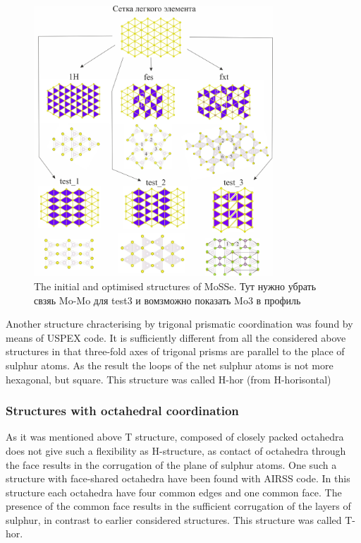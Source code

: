 \documentclass[a4paperm]{article}
\begin{document}
\begin{figure}[H] \centering
        \includegraphics[width=0.8\textwidth]{H-based.jpg}
        \caption{The initial and optimised structures of MoSSe. Тут нужно убрать свзяь Mo-Mo для test3 и вомзможно показать Mo3 в профиль}
\label{H-based}
\end{figure}


Another structure chracterising by trigonal prismatic coordination was found by means of USPEX code.
It is sufficiently different from all the considered above structures in that three-fold axes of trigonal prisms are parallel to the place of sulphur atoms.
As the result the loops of the net sulphur atoms is not more hexagonal, but square. 
This structure was called H-hor (from H-horisontal)

\subsubsection{Structures with octahedral coordination}

As it was mentioned above T structure, composed of closely packed octahedra does not give such a flexibility as H-structure, as contact of octahedra through the face results in the corrugation of the plane of sulphur atoms. 
One such a structure with face-shared octahedra have been found with AIRSS code.
In this structure each octahedra have four common edges and one common face.
The presence of the common face results in the sufficient corrugation of the layers of sulphur, in contrast to earlier considered structures.
This structure was called T-hor.
\end{document}
